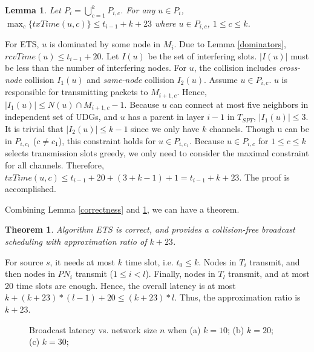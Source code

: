 \documentclass[10pt, conference]{IEEEtran}
\newtheorem{theorem}{Theorem}
\newtheorem{lemma}{Lemma}
\begin{document}
\begin{lemma} \label{connectors}
Let $P_i = \bigcup_{c=1}^k P_{i,c}$. For any $u \in P_{i}$, $\max_c \{txTime(u,c)\} \leq t_{i-1} +
k + 23$ where $u \in P_{i,c}$, $1 \leq c \leq k$.
\end{lemma}
\begin{IEEEproof}
For ETS, $u$ is dominated by some node in $M_{i}$. Due to Lemma
\ref{dominators}, $rcvTime(u) \leq t_{i-1} + 20$. Let $I(u)$ be
the set of interfering slots. $|I(u)|$ must be less than the
number of interfering nodes. For $u$, the collision includes
\emph{cross-node} collision $I_1(u)$ and \emph{same-node}
collision $I_2(u)$. Assume $u \in P_{i,c}$. $u$ is responsible
for transmitting packets to $M_{i+1,c}$. Hence, $|I_1(u)| \leq
N(u) \cap M_{i+1,c}-1$. Because $u$ can connect at most five
neighbors in independent set of UDGs, and $u$ has a parent in
layer $i-1$ in $T_{SPT}$, $|I_1(u)| \leq 3$. It is trivial that
$|I_2(u)| \leq k-1$ since we only have $k$ channels. Though u
can be in $P_{i, c_1}$ ($c \neq c_1$), this constraint holds
for $u \in P_{i, c_1}$. Because $u \in P_{i,c}$ for $1 \leq c
\leq k$ selects transmission slots greedy, we only need to
consider the maximal constraint for all channels. Therefore,
$txTime(u,c) \leq t_{i-1} + 20 + (3 + k-1) + 1 = t_{i-1}+k+23$.
The proof is accomplished.
\end{IEEEproof}





Combining Lemma \ref{correctness} and
\ref{connectors}, we can have a theorem.
\begin{theorem} \label{ETS}
Algorithm ETS is correct, and provides a collision-free
broadcast scheduling with approximation ratio of $k + 23$.
\end{theorem}
\begin{IEEEproof}
For source $s$, it needs at most $k$ time slot, i.e. $t_0 \leq k$.
Nodes in $T_{i}$ transmit, and then nodes in $PN_{i}$ transmit
($1 \leq i < l$). Finally, nodes in $T_{l}$ transmit, and at
most 20 time slots are enough.
Hence, the overall latency is at most $k + (k+23)*(l-1) + 20 \leq (k+23)*l$. Thus,
the approximation ratio is $k+23$.
\end{IEEEproof}




\begin{figure*}
\centering
{}
\caption{Broadcast latency vs. network size $n$ when (a) $k=10$; (b) $k=20$; (c) $k=30$;}
\label{fig1} \end{figure*}
\end{document}
